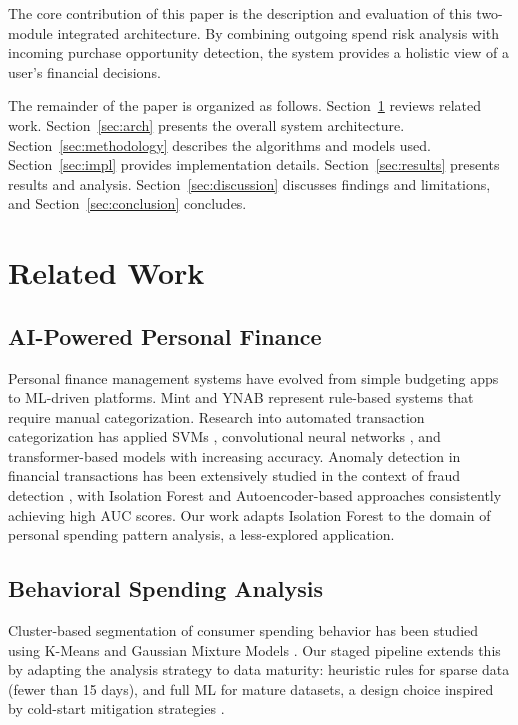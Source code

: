 \documentclass[]{IEEEtran}
\begin{document}
The core contribution of this paper is the description and evaluation of this two-module integrated architecture. By combining outgoing spend risk analysis with incoming purchase opportunity detection, the system provides a holistic view of a user's financial decisions.

The remainder of the paper is organized as follows. Section~\ref{sec:related} reviews related work. Section~\ref{sec:arch} presents the overall system architecture. Section~\ref{sec:methodology} describes the algorithms and models used. Section~\ref{sec:impl} provides implementation details. Section~\ref{sec:results} presents results and analysis. Section~\ref{sec:discussion} discusses findings and limitations, and Section~\ref{sec:conclusion} concludes.

\section{Related Work}
\label{sec:related}

\subsection{AI-Powered Personal Finance}
Personal finance management systems have evolved from simple budgeting apps to ML-driven platforms. Mint \cite{mint2023} and YNAB represent rule-based systems that require manual categorization. Research into automated transaction categorization has applied SVMs \cite{bose2016}, convolutional neural networks \cite{carta2021}, and transformer-based models \cite{yang2022} with increasing accuracy. Anomaly detection in financial transactions has been extensively studied in the context of fraud detection \cite{pozzolo2015}, with Isolation Forest \cite{liu2008} and Autoencoder-based approaches consistently achieving high AUC scores. Our work adapts Isolation Forest to the domain of personal spending pattern analysis, a less-explored application.

\subsection{Behavioral Spending Analysis}
Cluster-based segmentation of consumer spending behavior has been studied using K-Means \cite{wu2019spending} and Gaussian Mixture Models \cite{sharma2021}. Our staged pipeline extends this by adapting the analysis strategy to data maturity: heuristic rules for sparse data (fewer than 15 days), and full ML for mature datasets, a design choice inspired by cold-start mitigation strategies \cite{lika2014}.
\end{document}
